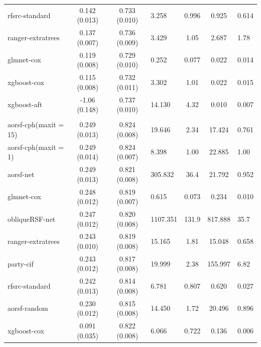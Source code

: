 \documentclass[twoside,11pt]{article}\usepackage[]{graphicx}\usepackage[]{color}
\newenvironment{knitrout}{}{} %
\begin{document}
\begin{knitrout}
\begin{longtable}{lcclccl}
\hspace{1em}rfsrc-standard & 0.142 (0.013) & 0.733 (0.010) & 3.258 & 0.996 & 0.925 & 0.614\\
\hspace{1em}ranger-extratrees & 0.137 (0.007) & 0.736 (0.009) & 3.429 & 1.05 & 2.687 & 1.78\\
\hspace{1em}glmnet-cox & 0.119 (0.008) & 0.729 (0.010) & 0.252 & 0.077 & 0.022 & 0.014\\
\hspace{1em}xgboost-cox & 0.115 (0.008) & 0.732 (0.011) & 3.302 & 1.01 & 0.022 & 0.015\\
\hspace{1em}xgboost-aft & -1.06 (0.148) & 0.737 (0.010) & 14.130 & 4.32 & 0.010 & 0.007\\
\addlinespace[0.3em]
\hline
\multicolumn{7}{l}{\textit{\textbf{Serum free light chain; death, n = 7874, p = 10}}}\\
\hline
\hspace{1em}aorsf-cph(maxit = 15) & 0.249 (0.013) & 0.824 (0.008) & 19.646 & 2.34 & 17.424 & 0.761\\
\hspace{1em}aorsf-cph(maxit = 1) & 0.249 (0.014) & 0.824 (0.007) & 8.398 & 1.00 & 22.885 & 1.00\\
\hspace{1em}aorsf-net & 0.249 (0.013) & 0.821 (0.008) & 305.832 & 36.4 & 21.792 & 0.952\\
\hspace{1em}glmnet-cox & 0.248 (0.012) & 0.819 (0.007) & 0.615 & 0.073 & 0.234 & 0.010\\
\hspace{1em}obliqueRSF-net & 0.247 (0.012) & 0.820 (0.008) & 1107.351 & 131.9 & 817.888 & 35.7\\
\hspace{1em}ranger-extratrees & 0.243 (0.010) & 0.819 (0.008) & 15.165 & 1.81 & 15.048 & 0.658\\
\hspace{1em}party-cif & 0.243 (0.012) & 0.817 (0.008) & 19.999 & 2.38 & 155.997 & 6.82\\
\hspace{1em}rfsrc-standard & 0.242 (0.013) & 0.814 (0.008) & 6.781 & 0.807 & 0.620 & 0.027\\
\hspace{1em}aorsf-random & 0.230 (0.012) & 0.815 (0.008) & 14.450 & 1.72 & 20.496 & 0.896\\
\hspace{1em}xgboost-cox & 0.091 (0.035) & 0.822 (0.008) & 6.066 & 0.722 & 0.136 & 0.006\\

\end{longtable}
\end{knitrout}
\end{document}
